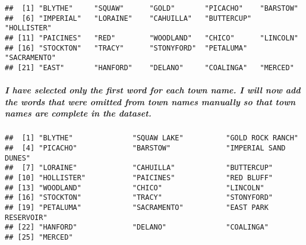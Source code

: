 \documentclass[]{article}
\newenvironment{Shaded}{\begin{snugshade}}{\end{snugshade}}
\newcommand{\ControlFlowTok}[1]{\textcolor[rgb]{0.13,0.29,0.53}{\textbf{#1}}}
\newcommand{\DataTypeTok}[1]{\textcolor[rgb]{0.13,0.29,0.53}{#1}}
\newcommand{\DecValTok}[1]{\textcolor[rgb]{0.00,0.00,0.81}{#1}}
\newcommand{\KeywordTok}[1]{\textcolor[rgb]{0.13,0.29,0.53}{\textbf{#1}}}
\newcommand{\NormalTok}[1]{#1}
\newcommand{\OperatorTok}[1]{\textcolor[rgb]{0.81,0.36,0.00}{\textbf{#1}}}
\newcommand{\StringTok}[1]{\textcolor[rgb]{0.31,0.60,0.02}{#1}}
\let\oldsubparagraph\subparagraph
\renewcommand{\subparagraph}[1]{\oldsubparagraph{#1}\mbox{}}
\begin{document}
\begin{verbatim}
##  [1] "BLYTHE"     "SQUAW"      "GOLD"       "PICACHO"    "BARSTOW"   
##  [6] "IMPERIAL"   "LORAINE"    "CAHUILLA"   "BUTTERCUP"  "HOLLISTER" 
## [11] "PAICINES"   "RED"        "WOODLAND"   "CHICO"      "LINCOLN"   
## [16] "STOCKTON"   "TRACY"      "STONYFORD"  "PETALUMA"   "SACRAMENTO"
## [21] "EAST"       "HANFORD"    "DELANO"     "COALINGA"   "MERCED"
\end{verbatim}

\hypertarget{i-have-selected-only-the-first-word-for-each-town-name.-i-will-now-add-the-words-that-were-omitted-from-town-names-manually-so-that-town-names-are-complete-in-the-dataset.}{%
\subparagraph{I have selected only the first word for each town name. I
will now add the words that were omitted from town names manually so
that town names are complete in the
dataset.}\label{i-have-selected-only-the-first-word-for-each-town-name.-i-will-now-add-the-words-that-were-omitted-from-town-names-manually-so-that-town-names-are-complete-in-the-dataset.}}

\begin{Shaded}
\end{Shaded}

\begin{verbatim}
##  [1] "BLYTHE"              "SQUAW LAKE"          "GOLD ROCK RANCH"    
##  [4] "PICACHO"             "BARSTOW"             "IMPERIAL SAND DUNES"
##  [7] "LORAINE"             "CAHUILLA"            "BUTTERCUP"          
## [10] "HOLLISTER"           "PAICINES"            "RED BLUFF"          
## [13] "WOODLAND"            "CHICO"               "LINCOLN"            
## [16] "STOCKTON"            "TRACY"               "STONYFORD"          
## [19] "PETALUMA"            "SACRAMENTO"          "EAST PARK RESERVOIR"
## [22] "HANFORD"             "DELANO"              "COALINGA"           
## [25] "MERCED"
\end{verbatim}
\end{document}
